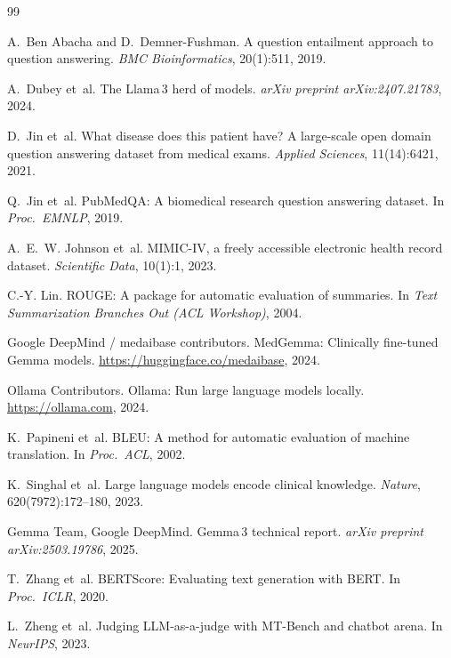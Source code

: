 \documentclass[11pt,twocolumn]{article}
\begin{document}
\begin{thebibliography}{99}

A.~Ben Abacha and D.~Demner-Fushman.
\newblock A question entailment approach to question answering.
\newblock \emph{BMC Bioinformatics}, 20(1):511, 2019.

A.~Dubey et~al.
\newblock The Llama\,3 herd of models.
\newblock \emph{arXiv preprint arXiv:2407.21783}, 2024.

D.~Jin et~al.
\newblock What disease does this patient have? A large-scale open domain
question answering dataset from medical exams.
\newblock \emph{Applied Sciences}, 11(14):6421, 2021.

Q.~Jin et~al.
\newblock PubMedQA: A biomedical research question answering dataset.
\newblock In \emph{Proc.\ EMNLP}, 2019.

A.~E.~W. Johnson et~al.
\newblock MIMIC-IV, a freely accessible electronic health record dataset.
\newblock \emph{Scientific Data}, 10(1):1, 2023.

C.-Y. Lin.
\newblock ROUGE: A package for automatic evaluation of summaries.
\newblock In \emph{Text Summarization Branches Out (ACL Workshop)}, 2004.

{Google DeepMind / medaibase contributors}.
\newblock MedGemma: Clinically fine-tuned Gemma models.
\newblock \url{https://huggingface.co/medaibase}, 2024.

{Ollama Contributors}.
\newblock Ollama: Run large language models locally.
\newblock \url{https://ollama.com}, 2024.

K.~Papineni et~al.
\newblock BLEU: A method for automatic evaluation of machine translation.
\newblock In \emph{Proc.\ ACL}, 2002.

K.~Singhal et~al.
\newblock Large language models encode clinical knowledge.
\newblock \emph{Nature}, 620(7972):172--180, 2023.

{Gemma Team, Google DeepMind}.
\newblock Gemma\,3 technical report.
\newblock \emph{arXiv preprint arXiv:2503.19786}, 2025.

T.~Zhang et~al.
\newblock BERTScore: Evaluating text generation with BERT.
\newblock In \emph{Proc.\ ICLR}, 2020.

L.~Zheng et~al.
\newblock Judging LLM-as-a-judge with MT-Bench and chatbot arena.
\newblock In \emph{NeurIPS}, 2023.

\end{thebibliography}
\end{document}
